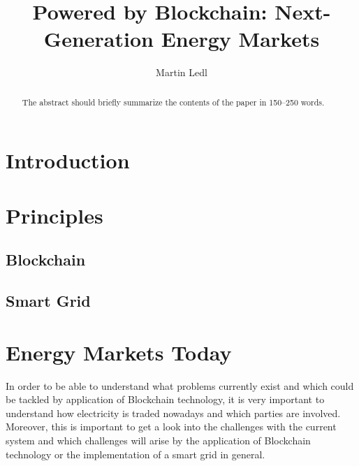 \documentclass[runningheads]{llncs}
\begin{document}
%
\title{Powered by Blockchain: Next-Generation Energy Markets}
%
%
\author{Martin Ledl}
%
%
%
\maketitle              %
%
\begin{abstract}
The abstract should briefly summarize the contents of the paper in
150--250 words.

\end{abstract}
%
%
%
\section{Introduction}

\section{Principles}

\subsection{Blockchain}

\subsection{Smart Grid}

\section{Energy Markets Today}
In order to be able to understand what problems currently exist and which could be tackled by application of Blockchain technology, it is very important to understand how electricity is traded nowadays and which parties are involved. Moreover, this is important to get a look into the challenges with the current system and which challenges will arise by the application of Blockchain technology or the implementation of a smart grid in general.
\end{document}

